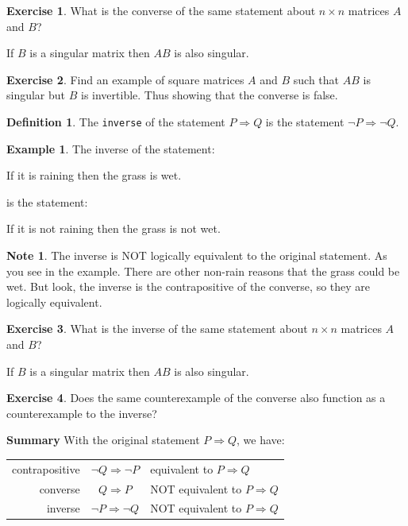 \documentclass[handout]{beamer}
\newcommand{\fn}{\insertframenumber}
\theoremstyle{definition}
\newtheorem{exercise}{Exercise}
\newtheorem*{defn}{Definition}
\newtheorem*{exa}{Example}
\newtheorem*{nb}{Note}
\renewcommand{\emph}[1]{{\color{blue}\texttt{#1}}}
\begin{document}
\begin{frame}{\fn}
\begin{exercise}
	What is the converse of the same statement about $n\times n$ matrices $A$ and $B$?
	\begin{center}
		If $B$ is a singular matrix then $AB$ is also singular.
	\end{center}
\end{exercise}
\begin{exercise}
	Find an example of square matrices $A$ and $B$ such that $AB$ is singular but $B$ is invertible.  Thus showing that the converse is false.
\end{exercise}
\end{frame}
\begin{frame}{\fn}
	\begin{defn}
		The \emph{inverse} of the statement $P\Rightarrow Q$ is the statement $\neg P\Rightarrow \neg Q$.
	\end{defn}
	\begin{exa}
		The inverse of the statement:
		\begin{center}
			If it is raining then the grass is wet.
		\end{center}
		is the statement:
		\begin{center}
			If it is not raining then the grass is not wet.
		\end{center}
	\end{exa}
	\begin{nb}
		The inverse is NOT logically equivalent to the original statement.  As you see in the example. There are other non-rain reasons that the grass could be wet. 
		But look, the inverse is the contrapositive of the converse, so they are logically equivalent.
	\end{nb}
\end{frame}
\begin{frame}{\fn}
\begin{exercise}
	What is the inverse of the same statement about $n\times n$ matrices $A$ and $B$?
	\begin{center}
		If $B$ is a singular matrix then $AB$ is also singular.
	\end{center}
\end{exercise}
	\begin{exercise}
		Does the same counterexample of the converse also function as a counterexample to the inverse?
	\end{exercise}
\end{frame}\begin{frame}{\fn}
\begin{block}{\textbf{Summary}}
	With the original statement $P\Rightarrow Q$, we have:
	\begin{center}
		\begin{tabular}{rcl}
			contrapositive & $\neg Q\Rightarrow \neg P$ & equivalent to $P\Rightarrow Q$\\
			converse & $Q\Rightarrow P$ & NOT equivalent to $P\Rightarrow Q$\\
			inverse & $\neg P\Rightarrow \neg Q$ & NOT equivalent to $P\Rightarrow Q$
		\end{tabular}
	\end{center}
\end{block}
\end{frame}
\end{document}
